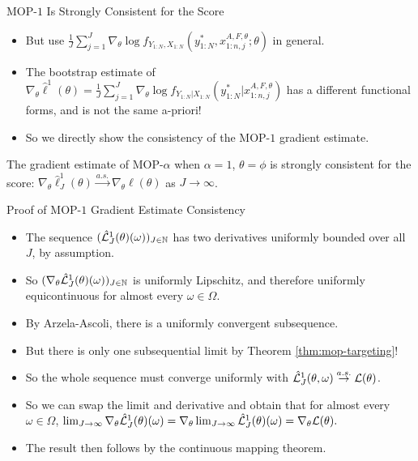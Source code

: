 \documentclass{beamer}
\begin{document}
\begin{frame}{MOP-$1$ Is Strongly Consistent for the Score}
    \begin{itemize}
        \item But \cite{poyiadjis11} use $\frac{1}{J}\sum_{j=1}^J \nabla_\theta \log f_{Y_{1:N}, X_{1:N}}\left(y_{1:N}^* , x_{1:n,j}^{A, F,\theta}; \theta\right)$ in general. \pause
        \item The bootstrap estimate of $\nabla_\theta \hat{\ell}^1(\theta) 
        = \frac{1}{J}\sum_{j=1}^J \nabla_\theta \log f_{Y_{1:N}|X_{1:N}}\left(y_{1:N}^* | x_{1:n,j}^{A, F,\theta}\right)$ has a different functional forms, and is not the same a-priori! \pause
        \item So we directly show the consistency of the MOP-$1$ gradient estimate. 
    \end{itemize}
    \pause
    \begin{thm}
        The gradient estimate of MOP-$\alpha$ when $\alpha=1$, $\theta=\phi$ is strongly consistent for the score: $\nabla_\theta \hat\ell_J^1(\theta) \stackrel{a.s.}{\to} \nabla_\theta \ell(\theta)$ as $J \to \infty$.
        \label{thm:mop-grad-consistency}
    \end{thm}
\end{frame}

\begin{frame}{Proof of MOP-$1$ Gradient Estimate Consistency}
    \begin{itemize}
        \item The sequence $(\hat{\mathcal{L}}_J^1(\theta)(\omega))_{J \in \mathbb{N}}$ has two derivatives uniformly bounded over all $J$, by assumption. \pause
        \item So $(\nabla_\theta \hat{\mathcal{L}}_J^1(\theta)( \omega))_{J \in \mathbb{N}}$ is uniformly Lipschitz, and therefore uniformly equicontinuous for almost every $\omega \in \Omega$.\pause
        \item By Arzela-Ascoli, there is a uniformly convergent subsequence. \pause
        \item But there is only one subsequential limit by Theorem \ref{thm:mop-targeting}!\pause
        \item So the whole sequence must converge uniformly with $\hat{\mathcal{L}}_J^1(\theta, \omega) \stackrel{a.s.}{\to} \mathcal{L}(\theta)$. \pause
        \item So we can swap the limit and derivative and obtain that for almost every $\omega \in \Omega$, 
    $\lim_{J \to \infty} \nabla_\theta \hat{\mathcal{L}}_J^1(\theta)(\omega) = \nabla_\theta \lim_{J \to \infty} \hat{\mathcal{L}}_J^1(\theta)(\omega) = \nabla_\theta \mathcal{L}(\theta).$\pause
        \item The result then follows by the continuous mapping theorem. 
    \end{itemize}
\end{frame}
\end{document}
